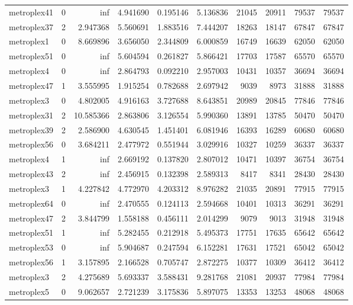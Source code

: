 \begin{longtable}{|l|r|r|r|r|r|r|r|r|r|}
metroplex41 & 0 & inf & 4.941690 & 0.195146 & 5.136836 & 21045 & 20911 & 79537 & 79537 \\
metroplex37 & 2 & 2.947368 & 5.560691 & 1.883516 & 7.444207 & 18263 & 18147 & 67847 & 67847 \\
metroplex1 & 0 & 8.669896 & 3.656050 & 2.344809 & 6.000859 & 16749 & 16639 & 62050 & 62050 \\
metroplex51 & 0 & inf & 5.604594 & 0.261827 & 5.866421 & 17703 & 17587 & 65570 & 65570 \\
metroplex4 & 0 & inf & 2.864793 & 0.092210 & 2.957003 & 10431 & 10357 & 36694 & 36694 \\
metroplex47 & 1 & 3.555995 & 1.915254 & 0.782688 & 2.697942 & 9039 & 8973 & 31888 & 31888 \\
metroplex3 & 0 & 4.802005 & 4.916163 & 3.727688 & 8.643851 & 20989 & 20845 & 77846 & 77846 \\
metroplex31 & 2 & 10.585366 & 2.863806 & 3.126554 & 5.990360 & 13891 & 13785 & 50470 & 50470 \\
metroplex39 & 2 & 2.586900 & 4.630545 & 1.451401 & 6.081946 & 16393 & 16289 & 60680 & 60680 \\
metroplex56 & 0 & 3.684211 & 2.477972 & 0.551944 & 3.029916 & 10327 & 10259 & 36337 & 36337 \\
metroplex4 & 1 & inf & 2.669192 & 0.137820 & 2.807012 & 10471 & 10397 & 36754 & 36754 \\
metroplex43 & 2 & inf & 2.456915 & 0.132398 & 2.589313 & 8417 & 8341 & 28430 & 28430 \\
metroplex3 & 1 & 4.227842 & 4.772970 & 4.203312 & 8.976282 & 21035 & 20891 & 77915 & 77915 \\
metroplex64 & 0 & inf & 2.470555 & 0.124113 & 2.594668 & 10401 & 10313 & 36291 & 36291 \\
metroplex47 & 2 & 3.844799 & 1.558188 & 0.456111 & 2.014299 & 9079 & 9013 & 31948 & 31948 \\
metroplex51 & 1 & inf & 5.282455 & 0.212918 & 5.495373 & 17751 & 17635 & 65642 & 65642 \\
metroplex53 & 0 & inf & 5.904687 & 0.247594 & 6.152281 & 17631 & 17521 & 65042 & 65042 \\
metroplex56 & 1 & 3.157895 & 2.166528 & 0.705747 & 2.872275 & 10377 & 10309 & 36412 & 36412 \\
metroplex3 & 2 & 4.275689 & 5.693337 & 3.588431 & 9.281768 & 21081 & 20937 & 77984 & 77984 \\
metroplex5 & 0 & 9.062657 & 2.721239 & 3.175836 & 5.897075 & 13353 & 13253 & 48068 & 48068 \\

\end{longtable}
